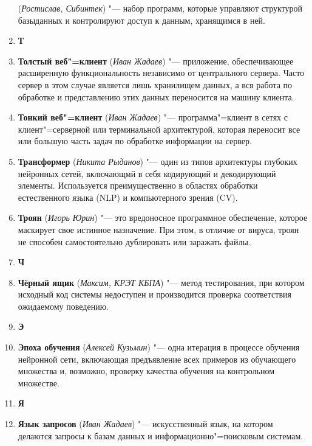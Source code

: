 \documentclass[a4paper, 14 pt]{extarticle}
\begin{document}
\begin{enumerate}
    (\textit{Ростислав, Сибинтек}) "--- набор программ, которые управляют 
    структурой базыданных и контролируют доступ к данным, хранящимся в ней. 
    \item[] \textbf{Т}
    \item \textbf{Толстый веб"=клиент} (\textit{Иван Жадаев}) "--- приложение, 
    обеспечивающее расширенную функциональность независимо от центрального 
    сервера. Часто сервер в этом случае является лишь хранилищем данных, а вся 
    работа по обработке и представлению этих данных переносится на машину 
    клиента.
    \item \textbf{Тонкий веб"=клиент} (\textit{Иван Жадаев}) "--- 
    программа"=клиент в сетях с клиент"=серверной или терминальной архитектурой, 
    которая переносит все или большую часть задач по обработке информации на 
    сервер.
    \item \textbf{Трансформер} (\textit{Никита Рыданов}) "--- один из типов 
    архитектуры глубоких нейронных сетей, включающмй в себя кодирующий и 
    декодирующий элементы. Используется преимущественно в областях обработки 
    естественного языка (NLP) и компьютерного зрения (CV).
    \item \textbf{Троян} (\textit{Игорь Юрин}) "--- это вредоносное программное 
    обеспечение, которое маскирует свое истинное назначение. При этом, в отличие 
    от вируса, троян не способен самостоятельно дублировать или заражать файлы. 
    \item[] \textbf{Ч}
    \item \textbf{Чёрный ящик} (\textit{Максим, КРЭТ КБПА}) "--- метод 
    тестирования, при котором исходный код системы недоступен и производится 
    проверка соответствия ожидаемому поведению.
    \item[] \textbf{Э}
    \item \textbf{Эпоха обучения} (\textit{Алексей Кузьмин}) "--- одна итерация 
    в процессе обучения нейронной сети, включающая предъявление всех примеров из 
    обучающего множества и, возможно, проверку качества обучения на контрольном 
    множестве.\\
    \item[] \textbf{Я}
    \item \textbf{Язык запросов} (\textit{Иван Жадаев}) "--- искусственный язык, 
    на котором делаются запросы к базам данных и информационно"=поисковым 
    системам.

\end{enumerate}
\end{document}
